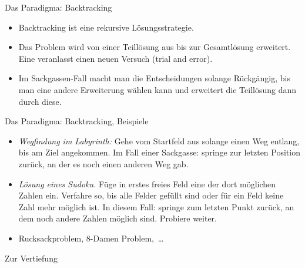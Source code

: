 \begin{frame}{Das Paradigma: Backtracking}
    \begin{itemize}[<+(1)->]
        \widei
        \item Backtracking ist eine rekursive Lösungsstrategie.
        \item Das Problem wird von einer Teillösung aus bis zur Gesamtlösung erweitert.\pause{} Eine  veranlasst einen neuen Versuch (trial and error).
        \item Im Sackgassen-Fall macht man die Entscheidungen solange Rückgängig, bis man eine andere Erweiterung wählen kann und erweitert die Teillösung dann durch diese.
    \end{itemize}
\end{frame}


\begin{frame}{Das Paradigma: Backtracking, Beispiele}
    \begin{itemize}[<+(1)->]
        \widei
        \item \emph{Wegfindung im Labyrinth:}\pause{} Gehe vom Startfeld aus solange einen Weg entlang, bis am Ziel angekommen.\pause{} Im Fall einer Sackgasse: springe zur letzten Position zurück, an der es noch einen anderen Weg gab.
        \item \emph{Lösung eines Sudoku.}\pause{} Füge in erstes freies Feld eine der dort möglichen Zahlen ein.\pause{} Verfahre so, bis alle Felder gefüllt sind oder für ein Feld keine Zahl mehr möglich ist.\pause{} In diesem Fall: springe zum letzten Punkt zurück, an dem noch andere Zahlen möglich sind. Probiere weiter.
        \item Rucksackproblem, 8-Damen Problem,~\ldots
    \end{itemize}
\end{frame}


\immediate{}
\begin{frame}[c]{Zur Vertiefung}
\centering\vspace*{2em}\par{}
\end{frame}

